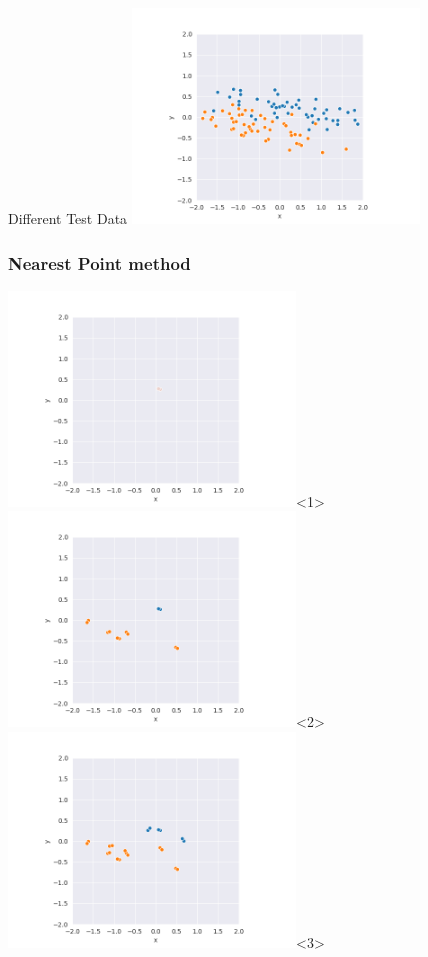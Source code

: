 \begin{frame}{Different Test Data}
  \includegraphics[width=3in]{../png/base_data_for_linkage.png}
\end{frame}
\begin{frame}
  \frametitle{Nearest Point method}
  \includegraphics[width=3in]{../png/single_stretch/single_stretch_1.png}<1>
  \includegraphics[width=3in]{../png/single_stretch/single_stretch_6.png}<2>
  \includegraphics[width=3in]{../png/single_stretch/single_stretch_11.png}<3>

\end{frame}
